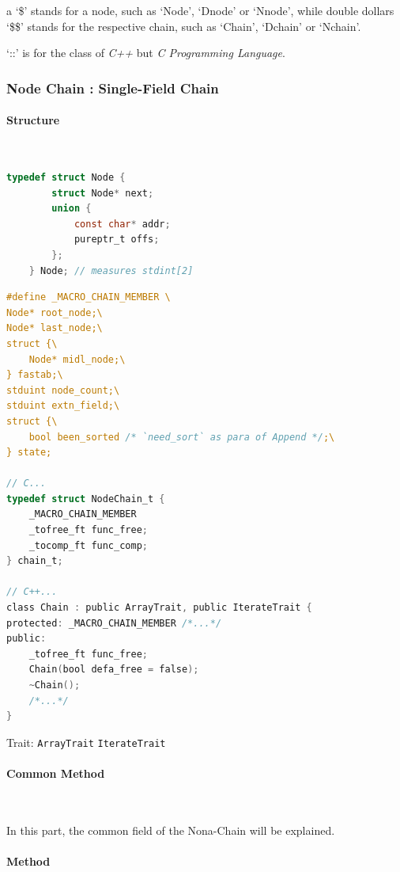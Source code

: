 a `\$' stands for a node, such as `Node', `Dnode' or `Nnode', while double dollars `\$\$' stands for the respective chain, such as `Chain', `Dchain' or `Nchain'.

`::' is for the class of \textit{C++} but \textit{C Programming Language}.



\subsubsection{Node Chain : Single-Field Chain}



\paragraph{Structure} \

\begin{lstlisting}[language=C]
	typedef struct Node {
		struct Node* next;
		union {
			const char* addr;
			pureptr_t offs;
		};
	} Node; // measures stdint[2]
\end{lstlisting}

\begin{lstlisting}[language=C]
#define _MACRO_CHAIN_MEMBER \
Node* root_node;\
Node* last_node;\
struct {\
	Node* midl_node;\
} fastab;\
stduint node_count;\
stduint extn_field;\
struct {\
	bool been_sorted /* `need_sort` as para of Append */;\
} state;

// C...
typedef struct NodeChain_t {
	_MACRO_CHAIN_MEMBER
	_tofree_ft func_free;
	_tocomp_ft func_comp;
} chain_t;

// C++...
class Chain : public ArrayTrait, public IterateTrait {
protected: _MACRO_CHAIN_MEMBER /*...*/
public:
	_tofree_ft func_free;
	Chain(bool defa_free = false);
	~Chain();
	/*...*/
}
\end{lstlisting}

Trait:  \verb|ArrayTrait| \verb|IterateTrait|



\paragraph{Common Method} \

In this part, the common field of the Nona-Chain will be explained.



\paragraph{Method} \

